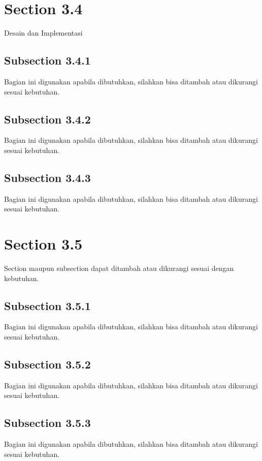 \section{Section 3.4}
Desain dan Implementasi

\subsection{Subsection 3.4.1}
Bagian ini digunakan apabila dibutuhkan, silahkan bisa ditambah atau dikurangi sesuai kebutuhan.

\subsection{Subsection 3.4.2}
Bagian ini digunakan apabila dibutuhkan, silahkan bisa ditambah atau dikurangi sesuai kebutuhan.

\subsection{Subsection 3.4.3}
Bagian ini digunakan apabila dibutuhkan, silahkan bisa ditambah atau dikurangi sesuai kebutuhan.

\section{Section 3.5}
Section maupun subsection dapat ditambah atau dikurangi sesuai dengan kebutuhan.

\subsection{Subsection 3.5.1}
Bagian ini digunakan apabila dibutuhkan, silahkan bisa ditambah atau dikurangi sesuai kebutuhan.

\subsection{Subsection 3.5.2}
Bagian ini digunakan apabila dibutuhkan, silahkan bisa ditambah atau dikurangi sesuai kebutuhan.

\subsection{Subsection 3.5.3}
Bagian ini digunakan apabila dibutuhkan, silahkan bisa ditambah atau dikurangi sesuai kebutuhan.